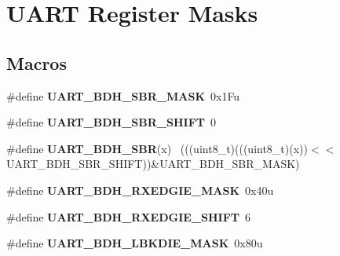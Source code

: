 \hypertarget{group___u_a_r_t___register___masks}{}\section{U\+A\+R\+T Register Masks}
\label{group___u_a_r_t___register___masks}
\subsection*{Macros}
\begin{DoxyCompactItemize}
\item 
\hypertarget{group___u_a_r_t___register___masks_ga2680dc8176b0c933b4a1b77c5dbb64b7}{}\#define {\bfseries U\+A\+R\+T\+\_\+\+B\+D\+H\+\_\+\+S\+B\+R\+\_\+\+M\+A\+S\+K}~0x1\+Fu\label{group___u_a_r_t___register___masks_ga2680dc8176b0c933b4a1b77c5dbb64b7}

\item 
\hypertarget{group___u_a_r_t___register___masks_gac38d8a98be282d97c4837597a6c02cda}{}\#define {\bfseries U\+A\+R\+T\+\_\+\+B\+D\+H\+\_\+\+S\+B\+R\+\_\+\+S\+H\+I\+F\+T}~0\label{group___u_a_r_t___register___masks_gac38d8a98be282d97c4837597a6c02cda}

\item 
\hypertarget{group___u_a_r_t___register___masks_ga28b137858fb0891d9d7e15f3664803c4}{}\#define {\bfseries U\+A\+R\+T\+\_\+\+B\+D\+H\+\_\+\+S\+B\+R}(x)                                                ~(((uint8\+\_\+t)(((uint8\+\_\+t)(x))$<$$<$U\+A\+R\+T\+\_\+\+B\+D\+H\+\_\+\+S\+B\+R\+\_\+\+S\+H\+I\+F\+T))\&U\+A\+R\+T\+\_\+\+B\+D\+H\+\_\+\+S\+B\+R\+\_\+\+M\+A\+S\+K)\label{group___u_a_r_t___register___masks_ga28b137858fb0891d9d7e15f3664803c4}

\item 
\hypertarget{group___u_a_r_t___register___masks_ga0882debd8f2c52d4ab8461b22b6519d9}{}\#define {\bfseries U\+A\+R\+T\+\_\+\+B\+D\+H\+\_\+\+R\+X\+E\+D\+G\+I\+E\+\_\+\+M\+A\+S\+K}~0x40u\label{group___u_a_r_t___register___masks_ga0882debd8f2c52d4ab8461b22b6519d9}

\item 
\hypertarget{group___u_a_r_t___register___masks_ga97c5d15ae3144492e364744236aa10f7}{}\#define {\bfseries U\+A\+R\+T\+\_\+\+B\+D\+H\+\_\+\+R\+X\+E\+D\+G\+I\+E\+\_\+\+S\+H\+I\+F\+T}~6\label{group___u_a_r_t___register___masks_ga97c5d15ae3144492e364744236aa10f7}

\item 
\hypertarget{group___u_a_r_t___register___masks_ga88fb29d1cb045a09e851a31c689ef60e}{}\#define {\bfseries U\+A\+R\+T\+\_\+\+B\+D\+H\+\_\+\+L\+B\+K\+D\+I\+E\+\_\+\+M\+A\+S\+K}~0x80u\label{group___u_a_r_t___register___masks_ga88fb29d1cb045a09e851a31c689ef60e}


\end{DoxyCompactItemize}
